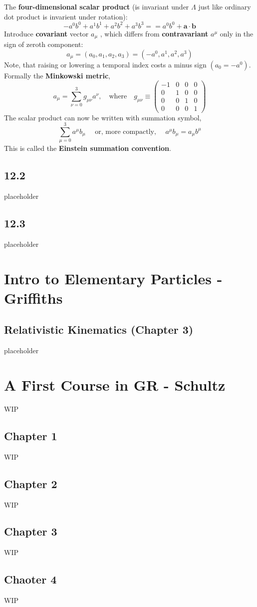 \documentclass[12pt]{book}
\begin{document}
The \textbf{four-dimensional scalar product} (is invariant under $\Lambda$ just like ordinary dot product is invarient under rotation): 
\[ 
-a^0b^0+a^1b^1+a^2b^2+a^3b^3 = =a^0b^0 + \mathbf{a \cdot b} 
\]
Introduce \textbf{covariant} vector $a_{\mu}$ , which differs from \textbf{contravariant}  $a^{\mu}$ only in the sign of zeroth component:
\[
a_{\mu}=(a_0, a_1, a_2, a_3)=(-a^0, a^1, a^2, a^3)
\] Note, that raising or lowering a temporal index costs a minus sign $(a_0=-a^0)$.  Formally the \textbf{Minkowski metric}, 
\[
a_{\mu} = \sum_{\nu=0}^{3} g_{\mu\nu} a^\nu , \quad \text{where} \quad g_{\mu\nu} \equiv
\begin{pmatrix}
-1 & 0 & 0 & 0 \\
0 & 1 & 0 & 0 \\
0 & 0 & 1 & 0 \\
0 & 0 & 0 & 1
\end{pmatrix}
\]
The scalar product can now be written with summation symbol,
\[
\sum_{\mu=0}^{3} a^{\mu} b_\mu \quad \text{ or, more compactly, } \quad a^\mu b_\mu =a_\mu b^\mu
\]
This is called the \textbf{Einstein summation convention}.
\section{12.2}
placeholder
\section{12.3}
placeholder

\chapter{Intro to Elementary Particles - Griffiths}
\section{Relativistic Kinematics (Chapter 3)}
placeholder

\chapter{A First Course in GR - Schultz}
WIP
\section{Chapter 1}
WIP
\section{Chapter 2}
WIP
\section{Chapter 3}
WIP
\section{Chaoter 4}
WIP
\end{document}
